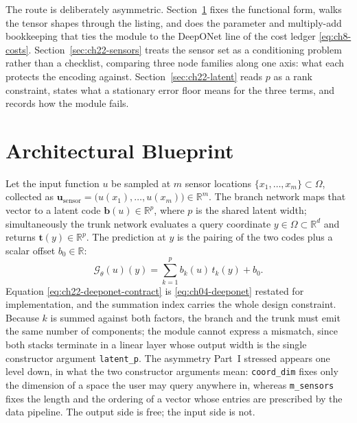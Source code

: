 The route is deliberately asymmetric. Section~\ref{sec:ch22-blueprint} fixes the functional
form, walks the tensor shapes through the listing, and does the parameter and multiply-add
bookkeeping that ties the module to the DeepONet line of the cost ledger
\eqref{eq:ch8-costs}. Section~\ref{sec:ch22-sensors} treats the sensor set as a conditioning
problem rather than a checklist, comparing three node families along one axis: what each
protects the encoding against. Section~\ref{sec:ch22-latent} reads $p$ as a rank constraint,
states what a stationary error floor means for the three terms, and records how the module
fails.

\section{Architectural Blueprint}
\label{sec:ch22-blueprint}

Let the input function $u$ be sampled at $m$ sensor locations
$\{x_1, \dots, x_m\} \subset \Omega$, collected as
$\mathbf{u}_{\mathrm{sensor}} = \big(u(x_1), \dots, u(x_m)\big) \in \mathbb{R}^m$. The branch
network maps that vector to a latent code $\mathbf{b}(u) \in \mathbb{R}^p$, where $p$ is the
shared latent width; simultaneously the trunk network
evaluates a query coordinate $y \in \Omega \subset \mathbb{R}^d$ and returns
$\mathbf{t}(y) \in \mathbb{R}^p$. The prediction at $y$ is the pairing of the two codes plus a
scalar offset $b_0 \in \mathbb{R}$:
\begin{equation}
  \label{eq:ch22-deeponet-contract}
  \mathcal{G}_\theta(u)(y) = \sum_{k=1}^p b_k(u) \, t_k(y) + b_0.
\end{equation}
Equation \eqref{eq:ch22-deeponet-contract} is \eqref{eq:ch04-deeponet} restated for
implementation, and the summation index carries the whole design constraint. Because $k$ is
summed against both factors, the branch and the trunk must emit the same number of components;
the module cannot express a mismatch, since both stacks terminate in a linear layer whose
output width is the single constructor argument \texttt{latent\_p}. The asymmetry Part~I
stressed appears one level down, in what the two constructor arguments mean: \texttt{coord\_dim}
fixes only the dimension of a space the user may query anywhere in, whereas \texttt{m\_sensors}
fixes the length and the ordering of a vector whose entries are prescribed by the data
pipeline. The output side is free;
the input side is not.

